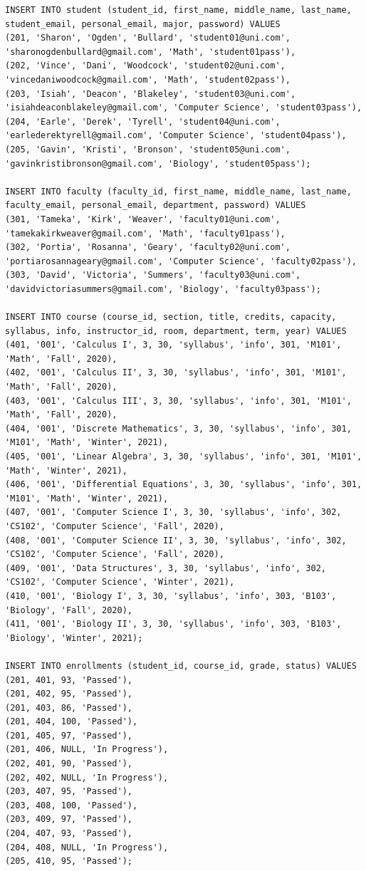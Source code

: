 \documentclass{report}
\begin{document}
\begin{lstlisting}
INSERT INTO student (student_id, first_name, middle_name, last_name, student_email, personal_email, major, password) VALUES
(201, 'Sharon', 'Ogden', 'Bullard', 'student01@uni.com', 'sharonogdenbullard@gmail.com', 'Math', 'student01pass'),
(202, 'Vince', 'Dani', 'Woodcock', 'student02@uni.com', 'vincedaniwoodcock@gmail.com', 'Math', 'student02pass'),
(203, 'Isiah', 'Deacon', 'Blakeley', 'student03@uni.com', 'isiahdeaconblakeley@gmail.com', 'Computer Science', 'student03pass'),
(204, 'Earle', 'Derek', 'Tyrell', 'student04@uni.com', 'earlederektyrell@gmail.com', 'Computer Science', 'student04pass'),
(205, 'Gavin', 'Kristi', 'Bronson', 'student05@uni.com', 'gavinkristibronson@gmail.com', 'Biology', 'student05pass');

INSERT INTO faculty (faculty_id, first_name, middle_name, last_name, faculty_email, personal_email, department, password) VALUES
(301, 'Tameka', 'Kirk', 'Weaver', 'faculty01@uni.com', 'tamekakirkweaver@gmail.com', 'Math', 'faculty01pass'),
(302, 'Portia', 'Rosanna', 'Geary', 'faculty02@uni.com', 'portiarosannageary@gmail.com', 'Computer Science', 'faculty02pass'),
(303, 'David', 'Victoria', 'Summers', 'faculty03@uni.com', 'davidvictoriasummers@gmail.com', 'Biology', 'faculty03pass');

INSERT INTO course (course_id, section, title, credits, capacity, syllabus, info, instructor_id, room, department, term, year) VALUES
(401, '001', 'Calculus I', 3, 30, 'syllabus', 'info', 301, 'M101', 'Math', 'Fall', 2020),
(402, '001', 'Calculus II', 3, 30, 'syllabus', 'info', 301, 'M101', 'Math', 'Fall', 2020),
(403, '001', 'Calculus III', 3, 30, 'syllabus', 'info', 301, 'M101', 'Math', 'Fall', 2020),
(404, '001', 'Discrete Mathematics', 3, 30, 'syllabus', 'info', 301, 'M101', 'Math', 'Winter', 2021),
(405, '001', 'Linear Algebra', 3, 30, 'syllabus', 'info', 301, 'M101', 'Math', 'Winter', 2021),
(406, '001', 'Differential Equations', 3, 30, 'syllabus', 'info', 301, 'M101', 'Math', 'Winter', 2021),
(407, '001', 'Computer Science I', 3, 30, 'syllabus', 'info', 302, 'CS102', 'Computer Science', 'Fall', 2020),
(408, '001', 'Computer Science II', 3, 30, 'syllabus', 'info', 302, 'CS102', 'Computer Science', 'Fall', 2020),
(409, '001', 'Data Structures', 3, 30, 'syllabus', 'info', 302, 'CS102', 'Computer Science', 'Winter', 2021),
(410, '001', 'Biology I', 3, 30, 'syllabus', 'info', 303, 'B103', 'Biology', 'Fall', 2020),
(411, '001', 'Biology II', 3, 30, 'syllabus', 'info', 303, 'B103', 'Biology', 'Winter', 2021);

INSERT INTO enrollments (student_id, course_id, grade, status) VALUES
(201, 401, 93, 'Passed'),
(201, 402, 95, 'Passed'),
(201, 403, 86, 'Passed'),
(201, 404, 100, 'Passed'),
(201, 405, 97, 'Passed'),
(201, 406, NULL, 'In Progress'),
(202, 401, 90, 'Passed'),
(202, 402, NULL, 'In Progress'),
(203, 407, 95, 'Passed'),
(203, 408, 100, 'Passed'),
(203, 409, 97, 'Passed'),
(204, 407, 93, 'Passed'),
(204, 408, NULL, 'In Progress'),
(205, 410, 95, 'Passed');


\end{lstlisting}
\end{document}

